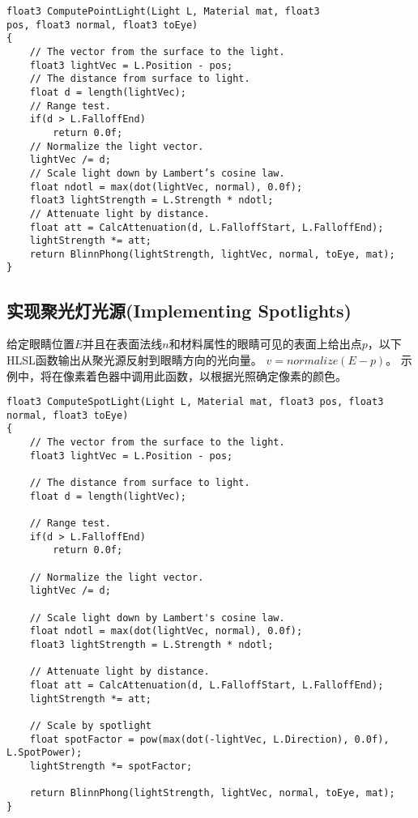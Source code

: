 \begin{lstlisting}
float3 ComputePointLight(Light L, Material mat, float3
pos, float3 normal, float3 toEye)
{
    // The vector from the surface to the light.
    float3 lightVec = L.Position - pos;
    // The distance from surface to light.
    float d = length(lightVec);
    // Range test.
    if(d > L.FalloffEnd)
        return 0.0f;
    // Normalize the light vector.
    lightVec /= d;
    // Scale light down by Lambert’s cosine law.
    float ndotl = max(dot(lightVec, normal), 0.0f);
    float3 lightStrength = L.Strength * ndotl;
    // Attenuate light by distance.
    float att = CalcAttenuation(d, L.FalloffStart, L.FalloffEnd);
    lightStrength *= att;
    return BlinnPhong(lightStrength, lightVec, normal, toEye, mat);
}
\end{lstlisting}

\subsection{实现聚光灯光源(Implementing Spotlights)}
\begin{flushleft}
给定眼睛位置$E$并且在表面法线$n$和材料属性的眼睛可见的表面上给出点$p$，以下HLSL函数输出从聚光源反射到眼睛方向的光向量。 $v =normalize(E-p)$。 示例中，将在像素着色器中调用此函数，以根据光照确定像素的颜色。\\
\end{flushleft}

\begin{lstlisting}
float3 ComputeSpotLight(Light L, Material mat, float3 pos, float3 normal, float3 toEye)
{
    // The vector from the surface to the light.
    float3 lightVec = L.Position - pos;

    // The distance from surface to light.
    float d = length(lightVec);

    // Range test.
    if(d > L.FalloffEnd)
        return 0.0f;

    // Normalize the light vector.
    lightVec /= d;

    // Scale light down by Lambert's cosine law.
    float ndotl = max(dot(lightVec, normal), 0.0f);
    float3 lightStrength = L.Strength * ndotl;

    // Attenuate light by distance.
    float att = CalcAttenuation(d, L.FalloffStart, L.FalloffEnd);
    lightStrength *= att;

    // Scale by spotlight
    float spotFactor = pow(max(dot(-lightVec, L.Direction), 0.0f), L.SpotPower);
    lightStrength *= spotFactor;

    return BlinnPhong(lightStrength, lightVec, normal, toEye, mat);
}
\end{lstlisting}

